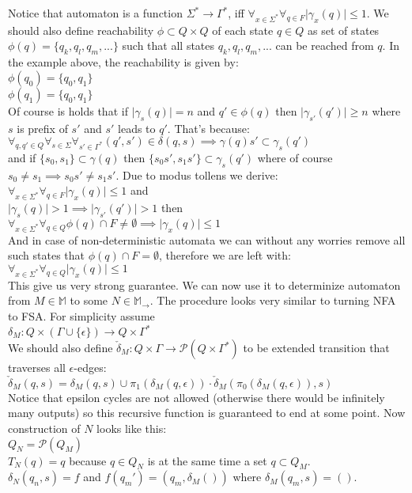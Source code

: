 \documentclass[12pt]{article}
\begin{document}
\begin{enumerate}
\begin{center}
\end{center}


Notice that automaton is a function $\Sigma^* \rightarrow \Gamma^*$, iff $\forall_{x\in\Sigma^*} \forall_{q\in F} \vert \gamma_x(q) \vert \le 1$. We should also define reachability $\phi \subset Q \times Q$ of each state $q\in Q$ as set of states $\phi(q) = \{q_k,q_l,q_m,...\}$ such that all states $q_k,q_l,q_m,...$ can be reached from $q$. In the example above, the reachability is given by: \\
$\phi(q_0) = \{q_0,q_1\}$ \\
$\phi(q_1) = \{q_0,q_1\}$ \\
Of course is holds that if $\vert \gamma_s(q) \vert = n$ and $q' \in \phi(q)$ then $\vert \gamma_{s'}(q') \vert \ge n$ where $s$ is prefix of $s'$ and $s'$ leads to $q'$. That's because: \\
$\forall_{q,q'\in Q} \forall_{s\in\Sigma} \forall_{s' \in \Gamma^*} (q',s') \in \delta(q,s) \implies  \gamma(q)s' \subset \gamma_{s}(q')$  \\
and if $\{s_0,s_1\} \subset\gamma(q)$ then $\{s_0s',s_1s'\} \subset\gamma_s(q')$ where of course $s_0 \ne s_1 \implies s_0s' \ne s_1s'$. Due to modus tollens we derive: \\ 
$\forall_{x\in\Sigma^*} \forall_{q\in F} \vert \gamma_x(q) \vert \le 1$ and \\
$\vert \gamma_s(q) \vert > 1 \implies \vert \gamma_{s'}(q') \vert  > 1$ then \\ $\forall_{x\in\Sigma^*} \forall_{q\in Q} \phi(q) \cap F \ne \emptyset \implies  \vert \gamma_x(q) \vert \le 1$ \\
And in case of non-deterministic automata we can without any worries remove all such states that $ \phi(q) \cap F = \emptyset$, therefore we are left with: \\
$\forall_{x\in\Sigma^*} \forall_{q\in Q} \vert \gamma_x(q) \vert \le 1$ \\
This give us very strong guarantee. We can now use it to determinize automaton from $M\in\mathbb{M}$ to some $N\in\mathbb{M}_\rightarrow$. The procedure looks very similar to turning NFA to FSA. For simplicity assume \\
$\delta_M : Q \times (\Gamma \cup \{\epsilon \}) \rightarrow Q \times \Gamma^*$\\
We should also define $\check{\delta}_M : Q \times \Gamma \rightarrow \mathcal{P}(Q \times \Gamma^*)$ to be extended transition that traverses all $\epsilon$-edges: \\
$\check{\delta}_M(q,s) = \delta_M(q,s) \cup \pi_1(\delta_M(q,\epsilon))\cdot \check{\delta}_M(\pi_0(\delta_M(q,\epsilon)),s) $  \\
Notice that epsilon cycles are not allowed (otherwise there would be infinitely many outputs) so this recursive function is guaranteed to end at some point.
Now construction of $N$ looks like this:\\
$Q_N = \mathcal{P}(Q_M)$ \\
$T_N(q) = q $ because $q\in Q_N$ is at the same time a set $q \subset Q_M$. \\
$\delta_N(q_n,s) = f$ and $f(q_m') = (q_m,\delta_M())$ where $\delta_M(q_m,s) = ()$.



\end{enumerate}
\end{document}
